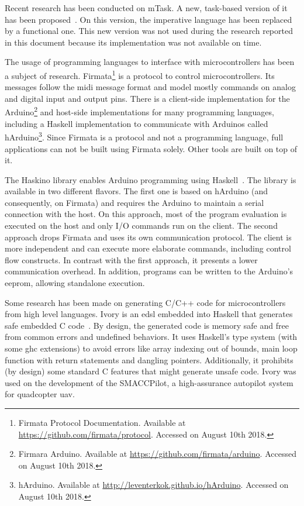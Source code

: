 Recent research has been conducted on mTask. A new, task-based version of it has been proposed~\cite{micro}. On this version, the imperative language has been replaced by a functional one. This new version was not used during the research reported in this document because its implementation was not available on time.

The usage of programming languages to interface with microcontrollers has been a subject of research. Firmata\footnote{Firmata Protocol Documentation. Available at \url{https://github.com/firmata/protocol}. Accessed on August 10th 2018.} is a protocol to control microcontrollers. Its messages follow the \acs{midi} message format and model mostly commands on analog and digital input and output pins. There is a client-side implementation for the Arduino\footnote{Firmara Arduino. Available at \url{https://github.com/firmata/arduino}. Accessed on August 10th 2018.} and host-side implementations for many programming languages, including a Haskell implementation to communicate with Arduinos called hArduino\footnote{hArduino. Available at \url{http://leventerkok.github.io/hArduino}. Accessed on August 10th 2018.}. Since Firmata is a protocol and not a programming language, full applications can not be built using Firmata solely. Other tools are built on top of it.

The Haskino library enables Arduino programming using Haskell~\cite{haskino}. The library is available in two different flavors. The first one is based on hArduino (and consequently, on Firmata) and requires the Arduino to maintain a serial connection with the host. On this approach, most of the program evaluation is executed on the host and only I/O commands run on the client. The second approach drops Firmata and uses its own communication protocol. The client is more independent and can execute more elaborate commands, including control flow constructs. In contrast with the first approach, it presents a lower communication overhead. In addition, programs can be written to the Arduino's \acs{eeprom}, allowing standalone execution.

Some research has been made on generating C/C++ code for microcontrollers from high level languages. Ivory is an \ac{edsl} embedded into Haskell that generates safe embedded C code~\cite{ivory1,ivory2}. By design, the generated code is memory safe and free from common errors and undefined behaviors. It uses Haskell's type system (with some \acs{ghc} extensions) to avoid errors like array indexing out of bounds, main loop function with return statements and dangling pointers. Additionally, it prohibits (by design) some standard C features that might generate unsafe code. Ivory was used on the development of the SMACCPilot, a high-assurance autopilot system for quadcopter \ac{uav}.


